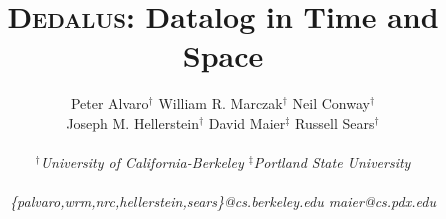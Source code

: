\documentclass{sig-alternate}
\def\lang{\textsc{Dedalus}\xspace}
\begin{document}
\title{{\huge{\bf\lang}}:
Datalog in Time and Space} 
%


\author{
%
Peter Alvaro$^\dagger$ \quad William R. Marczak$^\dagger$ \quad Neil
Conway$^\dagger$  \\
Joseph M. Hellerstein$^\dagger$ \quad 
David Maier$^\ddagger$ \quad Russell Sears$^\dagger$ 
\\\\
%
\fontsize{10}{10}\selectfont\itshape 
$^\dagger$University of California-Berkeley \quad $^\ddagger$Portland State
University\\\\ \fontsize{9}{9}\selectfont\ttfamily\upshape
%
\{palvaro,wrm,nrc,hellerstein,sears\}@cs.berkeley.edu \quad maier@cs.pdx.edu
%
}

\maketitle
\end{document}
